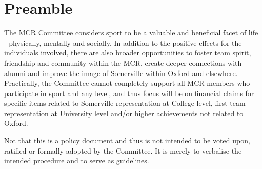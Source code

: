 \newcommand{\doctitle}	{Sports Budget Policy Document}
\newcommand{\docauthor}	{Rowan Nicholls}
\newcommand{\thedate}	{\today}
\newcommand{\comment}	{Version 4}




\section*{Preamble}
The MCR Committee considers sport to be a valuable and beneficial facet of life - physically, mentally and socially. In addition to the positive effects for the individuals involved, there are also broader opportunities to foster team spirit, friendship and community within the MCR, create deeper connections with alumni and improve the image of Somerville within Oxford and elsewhere. Practically, the Committee cannot completely support all MCR members who participate in sport and any level, and thus focus will be on financial claims for specific items related to Somerville representation at College level, first-team representation at University level and/or higher achievements not related to Oxford.

Not that this is a policy document and thus is not intended to be voted upon, ratified or formally adopted by the Committee. It is merely to verbalise the intended procedure and to serve as guidelines.

